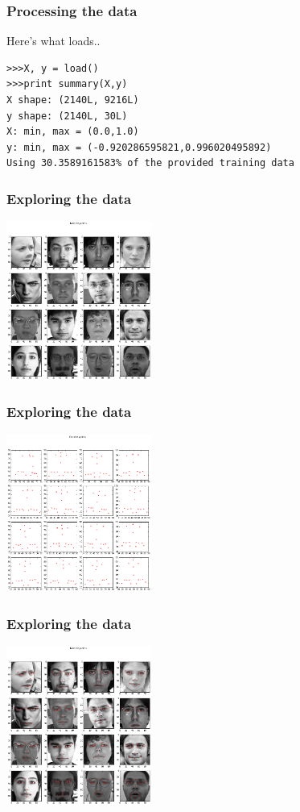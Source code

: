 \documentclass{beamer}
\begin{document}
\begin{frame}[fragile]
\frametitle{Processing the data}
\begin{block}{Here's what loads..}
\begin{verbatim}
>>>X, y = load()
>>>print summary(X,y)
X shape: (2140L, 9216L)
y shape: (2140L, 30L)
X: min, max = (0.0,1.0)
y: min, max = (-0.920286595821,0.996020495892)
Using 30.3589161583% of the provided training data
\end{verbatim}
\end{block}
\end{frame}
\begin{frame}[fragile]
\frametitle{Exploring the data}
\includegraphics[width=180px]{fk_face.png}
\end{frame}

\begin{frame}[fragile]
\frametitle{Exploring the data}
\includegraphics[width=180px]{fk_coord.png}
\end{frame}

\begin{frame}[fragile]
\frametitle{Exploring the data}
\includegraphics[width=180px]{fk_example.png}
\end{frame}
\end{document}
